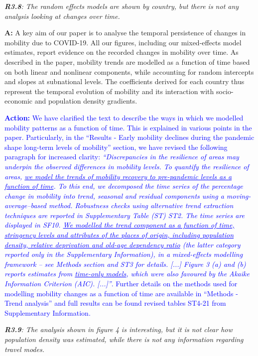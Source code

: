 \documentclass[12pt,a4paper,oneside, reqno]{amsart}
\begin{document}
\setlength{\leftskip}{0cm} \textit{\textbf{R3.8}: The random effects models are shown by country, but there is not any analysis looking at changes over time.}

\setlength{\leftskip}{1cm}\textbf{A:} A key aim of our paper is to analyse the temporal persistence of changes in mobility due to COVID-19. All our figures, including our mixed-effects model estimates, report evidence on the recorded changes in mobility over time. As described in the paper, mobility trends are modelled as a function of time based on both linear and nonlinear components, while accounting for random intercepts and slopes at subnational levels. The coefficients derived for each country thus represent the temporal evolution of mobility and its interaction with socio-economic and population density gradients.

\textcolor{blue}{
\textbf{Action:} We have clarified the text to describe the ways in which we modelled mobility patterns as a function of time. This is explained in various points in the paper. Particularly, in the ``Results - Early mobility declines during the pandemic shape long-term levels of mobility'' section, we have revised the following paragraph for increased clarity: \textit{``Discrepancies in the resilience of areas may underpin the observed differences in mobility levels. To quantify the resilience of areas, \ul{we model the trends of mobility recovery to pre-pandemic levels as a function of time}. To this end, we decomposed the time series of the percentage change in mobility into trend, seasonal and residual components using a moving-average–based method. Robustness checks using alternative trend extraction techniques are reported in Supplementary Table (ST) ST2. The time series are displayed in SF10. \ul{We modelled the trend component as a function of time, stringency levels and attributes of the places of origin, including population density, relative deprivation and old-age dependency ratio} (the latter category reported only in the Supplementary Information), in a mixed-effects modelling framework – see Methods section and ST3 for details. [...] Figure 3 (a) and (b) reports estimates from \ul{time-only models}, which were also favoured by the Akaike Information Criterion (AIC). [...]''}. Further details on the methods used for modelling mobility changes as a function of time are available in ``Methods - Trend analysis'' and full results can be found revised tables ST4-21 from Supplementary Information.
}

\setlength{\leftskip}{0cm} \textit{\textbf{R3.9}: The analysis shown in figure 4 is interesting, but it is not clear how population density was estimated, while there is not any information regarding travel modes.}
\end{document}
